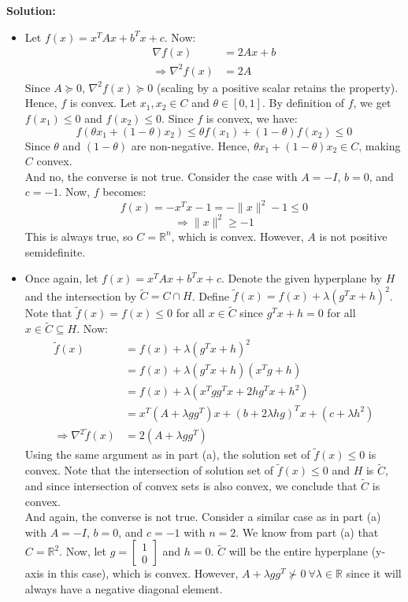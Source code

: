 \documentclass{article}
\begin{document}
\begin{itemize}
  \textbf{Solution:}
  \begin{itemize}
    \item[(a)] Let $f(x) = x^T A x + b^T x + c$. Now:
    \begin{align*}
      \nabla f(x) &= 2 A x + b \\
      \Rightarrow \nabla^2 f(x) &= 2 A
    \end{align*}
    Since $A \succeq 0$, $\nabla^2 f(x) \succeq 0$ (scaling by a positive scalar retains the property). Hence, $f$ is convex. Let $x_1, x_2 \in C$ and $\theta \in [0, 1]$. By definition of $f$, we get $f(x_1) \leq 0$ and $f(x_2) \leq 0$. Since $f$ is convex, we have:
    \[ f(\theta x_1 + (1 - \theta) x_2) \leq \theta f(x_1) + (1 - \theta) f(x_2) \leq 0 \]
    Since $\theta$ and $(1 - \theta)$ are non-negative. Hence, $\theta x_1 + (1 - \theta) x_2 \in C$, making $C$ convex. \\
    And no, the converse is not true. Consider the case with $A = -I$, $b = 0$, and $c = -1$. Now, $f$ becomes:
    \[ f(x) = -x^T x - 1 = -\|x\|^2 - 1 \le 0 \]
    \[ \Rightarrow \|x\|^2 \ge -1 \]
    This is always true, so $C = \mathbb{R}^n$, which is convex. However, $A$ is not positive semidefinite.
    \item[(b)] Once again, let $f(x) = x^T A x + b^T x + c$. Denote the given hyperplane by $H$ and the intersection by $\tilde{C} = C \cap H$. Define $\tilde{f}(x) = f(x) + \lambda(g^T x + h)^2$. Note that $\tilde{f}(x) = f(x) \le 0$ for all $x \in \tilde{C}$ since $g^T x + h = 0$ for all $x \in \tilde{C} \subseteq H$. Now:
    \begin{align*}
      \tilde{f}(x) &= f(x) + \lambda (g^T x + h)^2 \\
      &= f(x) + \lambda (g^T x + h)(x^T g + h) \\
      &= f(x) + \lambda (x^T g g^T x + 2 h g^T x + h^2) \\
      &= x^T (A + \lambda g g^T) x + (b + 2 \lambda h g)^T x + (c + \lambda h^2) \\
      \Rightarrow \nabla^2 \tilde{f}(x) &= 2 (A + \lambda g g^T)
    \end{align*}
    Using the same argument as in part (a), the solution set of $\tilde{f}(x) \leq 0$ is convex. Note that the intersection of solution set of $\tilde{f}(x) \leq 0$ and $H$ is $\tilde{C}$, and since intersection of convex sets is also convex, we conclude that $\tilde{C}$ is convex. \\
    And again, the converse is not true. Consider a similar case as in part (a) with $A = -I$, $b = 0$, and $c = -1$ with $n = 2$. We know from part (a) that $C = \mathbb{R}^2$. Now, let $g = \begin{bmatrix} 1 \\ 0 \end{bmatrix}$ and $h = 0$. $\tilde{C}$ will be the entire hyperplane (y-axis in this case), which is convex. However, $A + \lambda g g^T \nsucc 0 ~ \forall \lambda \in \mathbb{R}$ since it will always have a negative diagonal element.
  \end{itemize}


\end{itemize}
\end{document}
